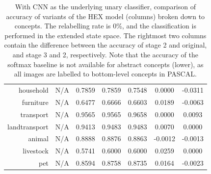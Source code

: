 \documentclass[11pt,a4paper]{article}
\begin{document}
\begin{table}[htbp]
\begin{tabular}{r|c|c|c|c|c|c}
household     & N/A    & 0.7859 & 0.7859 & 0.7548 & 0.0000 & -0.0311\\
furniture     & N/A    & 0.6477 & 0.6666 & 0.6603 & 0.0189 & -0.0063\\
transport     & N/A    & 0.9565 & 0.9565 & 0.9658 & 0.0000 & 0.0093\\
landtransport & N/A    & 0.9413 & 0.9483 & 0.9483 & 0.0070 & 0.0000\\
animal        & N/A    & 0.8888 & 0.8876 & 0.8863 & -0.0012 & -0.0013\\
livestock     & N/A    & 0.5741 & 0.6000 & 0.6000 & 0.0259 & 0.0000\\
pet           & N/A    & 0.8594 & 0.8758 & 0.8735 & 0.0164 & -0.0023
\end{tabular}
\caption{With CNN as the underlying unary classifier, comparison of accuracy of variants of the HEX model (columns) broken down to concepts. The relabelling rate is 0\%, and the classification is performed in the extended state space. The rightmost two columns contain the difference between the accuracy of stage 2 and original, and stage 3 and 2, respectively. Note that the accuracy of the softmax baseline is not available for abstract concepts (lower), as all images are labelled to bottom-level concepts in PASCAL.}
\label{tab:cnn0acc}
\end{table}
\end{document}
